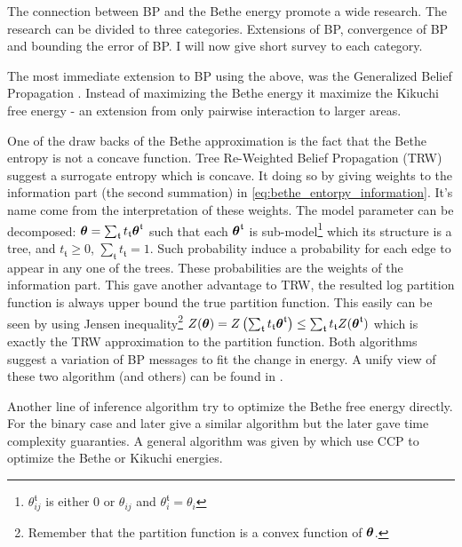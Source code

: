 The connection between BP and the Bethe energy promote a wide research.
The research can be divided to three categories.
Extensions of BP, convergence of BP and bounding the error of BP.
I will now give short survey to each category.  

The most immediate extension to BP using the above, was the Generalized Belief Propagation \cite{yedidia2000generalized}. 
Instead of maximizing the Bethe energy it maximize the Kikuchi free energy - an extension from only pairwise interaction to larger areas.

One of the draw backs of the Bethe approximation is the fact that the Bethe entropy is not a concave function.
Tree Re-Weighted Belief Propagation (TRW) \cite{wainwright2003tree} suggest a surrogate entropy  which is concave.
It doing so by giving weights to the information part (the second summation) in \eqref{eq:bethe_entorpy_information}.
It's name come from the interpretation of these weights.
The model parameter can be decomposed: $\boldsymbol{\theta}=\sum_{\mathfrak{t}} t_{\mathfrak{t}}\boldsymbol{\theta}^{\mathfrak{t}}$ such that each $\boldsymbol{\theta}^{\mathfrak{t}}$ is sub-model\footnote{$\theta^{\mathfrak{t}}_{ij}$ is either $0$ or $\theta_{ij}$ and $\theta^{\mathfrak{t}}_i =\theta_i$} which its structure is a tree, and $t_{\mathfrak{t}}\geq 0$, $\sum_{\mathfrak{t}} t_{\mathfrak{t}} = 1$.
Such probability induce a probability for each edge to appear in any one of the trees.
These probabilities are the weights of the information part.
This gave another advantage to TRW, the resulted log partition function is always upper bound the true partition function. 
This easily can be seen by using Jensen inequality\footnote{Remember that the partition function is a convex function of $\boldsymbol{\theta}$.} $Z(\boldsymbol{\theta}) = Z\left(\sum_{\mathfrak{t}} t_{\mathfrak{t}}\boldsymbol{\theta}^{\mathfrak{t}}\right) \leq \sum_{\mathfrak{t}} t_{\mathfrak{t}} Z(\boldsymbol{\theta}^{\mathfrak{t}})$ which is exactly the TRW approximation to the partition function.
Both algorithms suggest a variation of BP messages to fit the change in energy.
A unify view of these two algorithm (and others) can be found in \cite{meshi2009convexifying}.

Another line of inference algorithm try to optimize the Bethe free energy directly.
For the binary case \cite{welling2001belief} and later \cite{shin2012complexity} give a similar algorithm but the later gave time complexity guaranties.
A general algorithm was given by \cite{yuille2002cccp} which use CCP\cite{yuille2002concave} to optimize the Bethe or Kikuchi energies.

